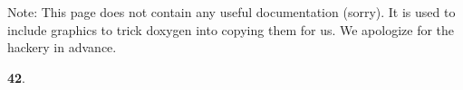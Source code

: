 Note\-: This page does not contain any useful documentation (sorry). It is used to include graphics to trick doxygen into copying them for us. We apologize for the hackery in advance.



{\bfseries 42}. 